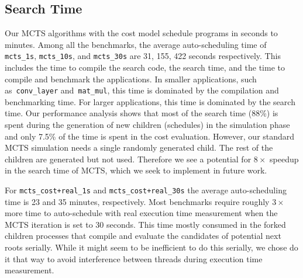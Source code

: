 \subsection{Search Time}
Our MCTS algorithms with the cost model schedule programs in seconds to minutes. Among all the benchmarks, the average auto-scheduling time of \texttt{mcts\_1s}, \texttt{mcts\_10s}, and \texttt{mcts\_30s} are 31, 155, 422 seconds respectively. This includes the time to compile the search code, the search time, and the time to compile and benchmark the applications. In smaller applications, such as~\texttt{conv\_layer} and~\texttt{mat\_mul}, this time is dominated by the compilation and benchmarking time. For larger applications, this time is dominated by the search time. Our performance analysis shows that most of the search time (88\%) is spent during the generation of new children (schedules) in the simulation phase and only 7.5\% of the time is spent in the cost evaluation. However, our standard MCTS simulation needs a single randomly generated child. The rest of the children are generated but not used. Therefore we see a potential for $8\times$ speedup in the search time of MCTS, which we seek to implement in future work.

For \texttt{mcts\_cost+real\_1s} and \texttt{mcts\_cost+real\_30s} the average auto-scheduling time is 23 and 35 minutes, respectively. Most benchmarks require roughly $3\times$ more time to auto-schedule with real execution time measurement when the MCTS iteration is set to 30 seconds. This time mostly consumed in the forked children processes that compile and evaluate the candidates of potential next roots serially. While it might seem to be inefficient to do this serially, we chose do it that way to avoid interference between threads during execution time measurement. 



